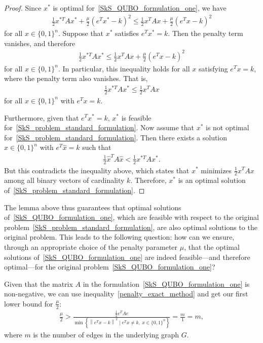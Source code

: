 \documentclass{article}
\begin{document}
\begin{proof}
Since $x^*$ is optimal for~\eqref{SkS_QUBO_formulation_one}, we have
\begin{align*}
\frac{1}{2} x^{*T} A x^* + \frac{\mu}{2} (e^T x^* - k)^2 \leq \frac{1}{2} x^T A x + \frac{\mu}{2} (e^T x - k)^2
\end{align*}
for all $x \in \{0,1\}^n$. Suppose that $x^*$ satisfies $e^T x^* = k$. Then the penalty term vanishes, and therefore
\begin{align*}
\frac{1}{2} x^{*T} A x^* \leq \frac{1}{2} x^T A x + \frac{\mu}{2} (e^T x - k)^2
\end{align*}
for all $x \in \{0,1\}^n$. In particular, this inequality holds for all $x$ satisfying $e^T x = k$, where the penalty term also vanishes. That is,
\begin{align*}
\frac{1}{2} x^{*T} A x^* \leq \frac{1}{2} x^T A x 
\end{align*}
for all $x \in \{0,1\}^n$ with $e^T x = k$.

Furthermore, given that $e^T x^* = k$, $x^*$ is feasible for~\eqref{SkS_problem_standard_formulation}. Now assume that $x^*$ is not optimal for~\eqref{SkS_problem_standard_formulation}. Then there exists a solution $\hat{x} \in \{0,1\}^n$ with $e^T \hat{x} = k$ such that
\begin{align*}
\frac{1}{2} \hat{x}^T A \hat{x} < \frac{1}{2} x^{*T} A x^*.
\end{align*}
But this contradicts the inequality above, which states that $x^*$ minimizes $\frac{1}{2} x^T A x$ among all binary vectors of cardinality $k$. Therefore, $x^*$ is an optimal solution of~\eqref{SkS_problem_standard_formulation}.
\end{proof}

The lemma above thus guarantees that optimal solutions of~\eqref{SkS_QUBO_formulation_one}, which are feasible with respect to the original problem~\eqref{SkS_problem_standard_formulation}, are also optimal solutions to the original problem. This leads to the following question: how can we ensure, through an appropriate choice of the penalty parameter $\mu$, that the optimal solutions of~\eqref{SkS_QUBO_formulation_one} are indeed feasible---and therefore optimal---for the original problem~\eqref{SkS_QUBO_formulation_one}?

Given that the matrix $A$ in the formulation~\eqref{SkS_QUBO_formulation_one} is non-negative, we can use inequality~\eqref{penalty_exact_method} and get our first lower bound for $\frac{\mu}{2}$: 
\begin{align*}
    \frac{\mu}{2} > \frac{\frac{1}{2}e^T A e}{\min \left\{ \left \| e^Tx - k \right \|^2 \mid e^Tx \neq k, ~x \in \{0, 1\}^n \right\}} = \frac{m}{1} = m,
\end{align*}
where $m$ is the number of edges in the underlying graph $G$.
\end{document}
